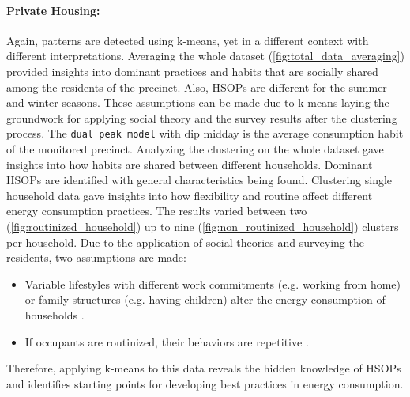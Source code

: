 \paragraph*{Private Housing:}
Again, patterns are detected using k-means, yet in a different context with different interpretations.
Averaging the whole dataset (\autoref{fig:total_data_averaging}) provided insights into dominant practices and habits that are socially shared among the residents of the precinct.
Also, HSOPs are different for the summer and winter seasons.
These assumptions can be made due to k-means laying the groundwork for applying social theory and the survey results after the clustering process.
The \texttt{dual peak model} with dip midday is the average consumption habit of the monitored precinct.
Analyzing the clustering on the whole dataset gave insights into how habits are shared between different households.
Dominant HSOPs are identified with general characteristics being found.
Clustering single household data gave insights into how flexibility and routine affect different energy consumption practices.
The results varied between two (\autoref{fig:routinized_household}) up to nine (\autoref{fig:non_routinized_household}) clusters per household.
Due to the application of social theories and surveying the residents, two assumptions are made:
\begin{itemize}
    \item Variable lifestyles with different work commitments (e.g. working from home) or family structures (e.g. having children) alter the energy consumption of households \cite{KUR-HBP}.
    \item If occupants are routinized, their behaviors are repetitive \cite{BRE-EWP}.
\end{itemize}
Therefore, applying k-means to this data reveals the hidden knowledge of HSOPs and identifies starting points for developing best practices in energy consumption.



